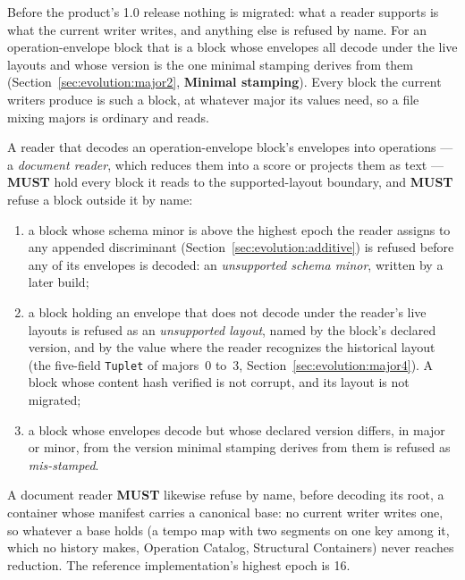 \documentclass[11pt,letterpaper]{report}
\newcommand{\tablenums}[1]{{\addfontfeatures{Numbers={Lining,Tabular}}#1}}
\newcommand{\sectionsc}[1]{{\addfontfeatures{Letters=SmallCaps}#1}}
\newcounter{requirement}[chapter]
\newcommand{\MUST}{\textbf{MUST}}
\begin{document}
Before the product's 1.0 release nothing is migrated: what a reader supports
is what the current writer writes, and anything else is refused by name. For
an operation-envelope block that is a block whose envelopes all decode under
the live layouts and whose version is the one minimal stamping derives from
them (Section~\ref{sec:evolution:major2}, \textbf{Minimal stamping}). Every
block the current writers produce is such a block, at whatever major its
values need, so a file mixing majors is ordinary and reads.

\begin{requirement}
  \label{req:binfmt:op-block-boundary}
  A reader that decodes an operation-envelope block's envelopes into
  operations --- a \emph{document reader}, which reduces them into a score or
  projects them as text --- \MUST{} hold every block it reads to the
  supported-layout boundary, and \MUST{} refuse a block outside it by name:
  \begin{enumerate}
    \item a block whose schema minor is above the highest epoch the reader
      assigns to any appended discriminant
      (Section~\ref{sec:evolution:additive}) is refused before any of its
      envelopes is decoded: an \emph{unsupported schema minor}, written by a
      later build;
    \item a block holding an envelope that does not decode under the
      reader's live layouts is refused as an \emph{unsupported layout},
      named by the block's declared version, and by the value where the
      reader recognizes the historical layout (the five-field
      \texttt{Tuplet} of majors~0 to~3,
      Section~\ref{sec:evolution:major4}). A block whose content hash
      verified is not corrupt, and its layout is not migrated;
    \item a block whose envelopes decode but whose declared version
      differs, in major or minor, from the version minimal stamping derives
      from them is refused as \emph{mis-stamped}.
  \end{enumerate}
  A document reader \MUST{} likewise refuse by name, before decoding its
  root, a container whose manifest carries a canonical base: no current
  writer writes one, so whatever a base holds (a tempo map with two segments
  on one key among it, which no history makes, Operation Catalog,
  \sectionsc{Structural Containers}) never reaches reduction.
  The reference implementation's highest epoch is \tablenums{16}.
\end{requirement}
\end{document}
